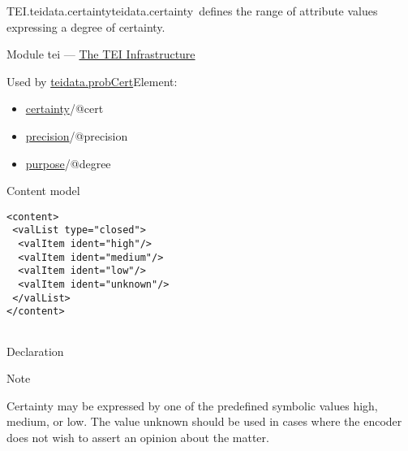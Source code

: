 \begin{reflist}
\item[]\begin{specHead}{TEI.teidata.certainty}{teidata.certainty} defines the range of attribute values expressing a degree of certainty.\end{specHead} 
    \item[{Module}]
  tei — \hyperref[ST]{The TEI Infrastructure}
    \item[{Used by}]
  \hyperref[TEI.teidata.probCert]{teidata.probCert}Element: \begin{itemize}
\item \hyperref[TEI.certainty]{certainty}/@cert
\item \hyperref[TEI.precision]{precision}/@precision
\item \hyperref[TEI.purpose]{purpose}/@degree
\end{itemize} 
    \item[{Content model}]
  \mbox{}\hfill\\[-10pt]\begin{Verbatim}[fontsize=\small]
<content>
 <valList type="closed">
  <valItem ident="high"/>
  <valItem ident="medium"/>
  <valItem ident="low"/>
  <valItem ident="unknown"/>
 </valList>
</content>
    
\end{Verbatim}

    \item[{Declaration}]
    \item[{Note}]
  \par
Certainty may be expressed by one of the predefined symbolic values high, medium, or low. The value unknown should be used in cases where the encoder does not wish to assert an opinion about the matter. 
\end{reflist}  
